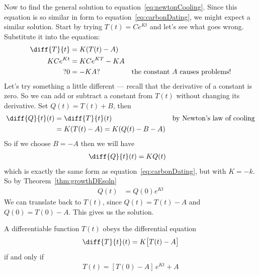 Now to find the general solution to equation~\eqref{eq:newtonCooling}. Since this
equation is so similar in form to equation~\eqref{eq:carbonDating}, we might expect a
similar solution. Start by trying $T(t) = Ce^{Kt}$ and let's see what goes
wrong. Substitute it into the equation:
\begin{align*}
  \diff{T}{t} &= K( T(t)- A) \\
  K C e^{Kt} &= KCe^{KT} - KA \\
  ?0 & = -KA? & \text{the constant $A$ causes problems!}
\end{align*}
Let's try something a little different --- recall that the derivative of a
constant is zero. So we can add or subtract a constant from $T(t)$ without
changing its derivative. Set $Q(t) =
T(t)+B$, then
\begin{align*}
  \diff{Q}{t}(t) &= \diff{T}{t}(t) & \text{by Newton's law of cooling}\\
    & = K(T(t)-A) = K(Q(t)-B-A)
\end{align*}
So if we choose $B=-A$ then we will have
\begin{align*}
  \diff{Q}{t}(t) &= K Q(t)
\end{align*}
which is exactly the same form as equation~\eqref{eq:carbonDating}, but with $K=-k$. So
by Theorem~\ref{thm:growthDEsoln}
\begin{align*}
  Q(t) &= Q(0) e^{Kt}
\end{align*}
We can translate back to $T(t)$, since $Q(t)=T(t)-A$ and $Q(0)=T(0)-A$. This gives us the
solution.
\begin{cor}\label{cor:coolingDEsoln}
A differentiable function $T(t)$ obeys the differential equation
\begin{align*}
\diff{T}{t}(t) = K\big[T(t)-A\big]
\end{align*}
if and only if
\begin{align*}
T(t) = [T(0)-A]\,e^{Kt} + A
\end{align*}
\end{cor}

